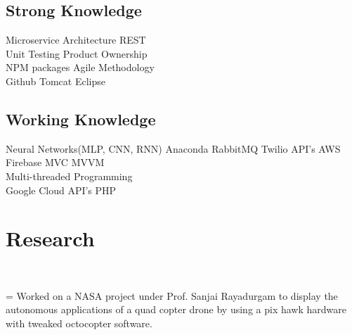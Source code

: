 \documentclass[]{rinkal_resume}
\begin{document}
\begin{minipage}[t]{0.30\textwidth}
\vspace{1pt}
\subsection{Strong Knowledge}
\vspace{1pt}
Microservice Architecture \textbullet{}
REST \textbullet{} \\
Unit Testing \textbullet{}
Product Ownership \textbullet{} \\
NPM packages \textbullet{}
Agile Methodology \textbullet{} \\
Github \textbullet{} 
Tomcat \textbullet{}
Eclipse %
\sectionsep

\vspace{1pt}
\subsection{Working Knowledge}
\vspace{1pt}
Neural Networks(MLP, CNN, RNN)  \textbullet{}
Anaconda \textbullet{}
RabbitMQ \textbullet{}
Twilio API's \textbullet{}
AWS \textbullet{}
Firebase \textbullet{}
MVC \textbullet{}
MVVM \textbullet{} \\
Multi-threaded Programming  \textbullet{} \\
Google Cloud API's\textbullet{} 
PHP \textbullet{}
\sectionsep


\section{Research}
 \\

\newlength\boxwid
\settowidth{\boxwid}{\indent\hspace{0.5cm}}

\hspace{0.2cm} \hangindent=\boxwid 
\textbullet{} Worked on a NASA project under Prof. Sanjai Rayadurgam to display the autonomous applications of a quad copter drone by using a pix hawk hardware with tweaked octocopter software. \\


\end{minipage}
\end{document}
